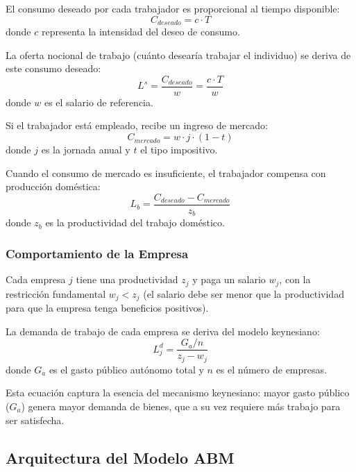 El consumo deseado por cada trabajador es proporcional al tiempo disponible:
\begin{equation}
C_{deseado} = c \cdot T
\end{equation}
donde $c$ representa la intensidad del deseo de consumo.

La oferta nocional de trabajo (cuánto desearía trabajar el individuo) se deriva de este consumo deseado:
\begin{equation}
L^s = \frac{C_{deseado}}{w} = \frac{c \cdot T}{w}
\end{equation}
donde $w$ es el salario de referencia.

Si el trabajador está empleado, recibe un ingreso de mercado:
\begin{equation}
C_{mercado} = w \cdot j \cdot (1 - t)
\end{equation}
donde $j$ es la jornada anual y $t$ el tipo impositivo.

Cuando el consumo de mercado es insuficiente, el trabajador compensa con producción doméstica:
\begin{equation}
L_b = \frac{C_{deseado} - C_{mercado}}{z_b}
\end{equation}
donde $z_b$ es la productividad del trabajo doméstico.

\subsubsection{Comportamiento de la Empresa}

Cada empresa $j$ tiene una productividad $z_j$ y paga un salario $w_j$, con la restricción fundamental $w_j < z_j$ (el salario debe ser menor que la productividad para que la empresa tenga beneficios positivos).

La demanda de trabajo de cada empresa se deriva del modelo keynesiano:
\begin{equation}
L_j^d = \frac{G_a / n}{z_j - w_j}
\end{equation}
donde $G_a$ es el gasto público autónomo total y $n$ es el número de empresas.

Esta ecuación captura la esencia del mecanismo keynesiano: mayor gasto público ($G_a$) genera mayor demanda de bienes, que a su vez requiere más trabajo para ser satisfecha.

\subsection{Arquitectura del Modelo ABM}

